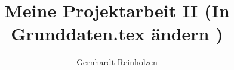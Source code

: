 
\title{Meine Projektarbeit II (In Grunddaten.tex ändern    )}
\author{Gernhardt Reinholzen}

\newcommand{\Kurs}{WI13C}
\newcommand{\guardian}{Prof. David R. Hart}
\newcommand{\company}{mongoloid GmBH}

